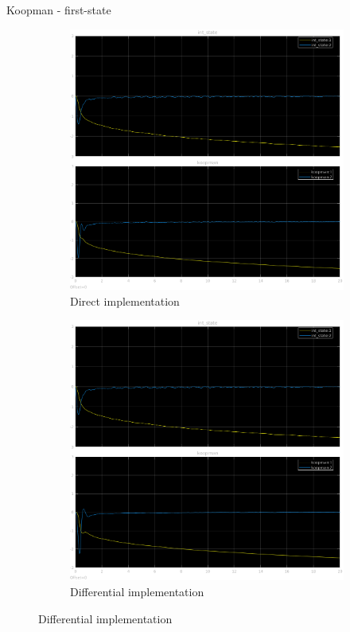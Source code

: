 \documentclass{beamer}
\begin{document}
\begin{frame}{Koopman - first-state}
    \begin{figure}
        \centering
        \begin{subfigure}[b]{0.45\textwidth}
            \centering
            \includegraphics[width=\textwidth]{first_koopman_direct.png}
            \caption{Direct implementation}
        \end{subfigure}
        \hfill
        \begin{subfigure}[b]{0.45\textwidth}
            \centering
            \includegraphics[width=\textwidth]{first_koopman_differential.png}
            \caption{Differential implementation}
        \end{subfigure}
    \end{figure}
\end{frame}
\end{document}
